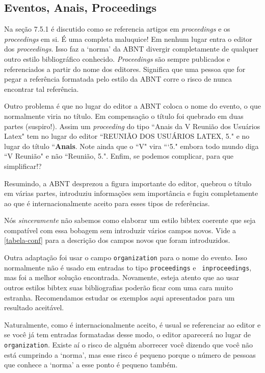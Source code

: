 \documentclass[a4paper]{ltxdoc}
\begin{document}
\subsection{Eventos, Anais, Proceedings}

Na seção 7.5.1\cite{NBR6023:2000} é discutido como se referencia artigos em
\textit{proceedings} e os \textit{proceedings} em si. É uma completa maluquice!
Em nenhum lugar entra o editor dos \textit{proceedings}. Isso faz a `norma' da
ABNT divergir completamente de qualquer outro estilo bibliográfico conhecido.
\textit{Proceedings} são sempre publicados e referenciados a partir do nome dos
editores. Significa que uma pessoa que for pegar a referência formatada pelo
estilo da ABNT corre o risco de nunca encontrar tal referência.

Outro problema é que no lugar do editor a ABNT coloca o nome do evento, o que
normalmente viria no título. Em compensação o título foi quebrado em duas partes
(suspiro!). Assim um \textit{proceeding} do tipo ``Anais da V Reunião dos
Usuários Latex" tem no lugar do editor ``REUNIÃO DOS USUÁRIOS LATEX, 5." e no lugar
do título ``\textbf{Anais}. Note ainda que o ``V" vira ```5." embora
todo mundo diga ``V Reunião" e não ``Reunião, 5.". Enfim, se podemos complicar,
para que simplificar!?

Resumindo, a ABNT desprezou a figura importante do editor, quebrou o título
em várias partes, introduziu informações sem importância e fugiu completamente
ao que é internacionalmente aceito para esses tipos de referências.

Nós \emph{sinceramente} não sabemos como elaborar um estilo \textsf{bibtex}
coerente que seja compatível com essa bobagem sem introduzir vários campos novos.
Vide a \autoref{tabela-conf} para a descrição dos campos novos que foram
introduzidos.

Outra adaptação foi usar o campo \texttt{organization} para o nome do evento. Isso
normalmente não é usado em entradas to tipo \texttt{proceedings} e \texttt{
inproceedings}, mas foi a melhor solução encontrada. Novamente, esteja atento
que ao usar outros estilos \textsf{bibtex} suas bibliografias poderão ficar com
uma cara muito estranha. Recomendamos estudar os exemplos aqui apresentados para
um resultado aceitável.

Naturalmente, como é internacionalmente aceito, é usual se referenciar ao
editor e se você já tem entradas formatadas desse modo, o editor aparecerá
no lugar de \texttt{organization}. Existe aí o risco de alguém aborrecer você
dizendo que você não está cumprindo a `norma', mas esse risco é pequeno
porque o número de pessoas que conhece a `norma' a esse ponto é
pequeno também.
\end{document}
